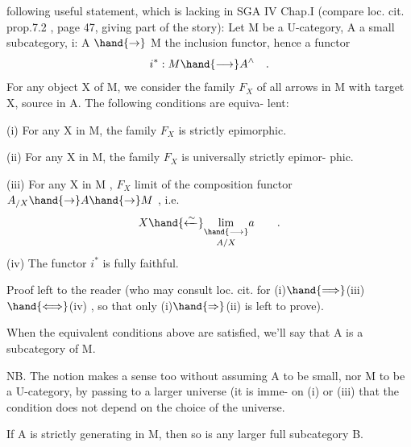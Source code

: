 
following useful statement,  which is lacking in SGA IV Chap.I
(compare loc. cit.  prop.7.2 , page 47,  giving part of the story):
\hand{\uline{\textcolor{black}{Proposition}}}  Let M be a U-category,  A a small  subcategory,  i: A $\hand{\to}$ M
the inclusion functor,  hence a functor
\[ i^{*} : M \hand{\longrightarrow} A^{\wedge} \quad . \]
For any object X of M,  we consider the family \xout{\unsure{$\Phi$}} $F_X$  of all arrows
in M with target X,  source in A.  The following conditions are equiva-%
lent:

(i)  For any X in M,  the family $F_X$ is strictly epimorphic.

(ii) For any X in M,  the family $F_X$ is universally strictly epimor-%
phic.

(iii)  For any X in M ,  $F_X$   limit of the
composition functor  $A_{/X} \hand{\to} A \hand{\to} M$ ,  i.e.
\[ X \hand{\xleftarrow{\sim}} \underset{A/X}{\underset{\hand{\longrightarrow}}{\mathrm{lim}}} a \qquad . \]
(iv)  The functor $i^{*}$ is fully faithful.

Proof left to the reader (who may consult loc. cit. for 
(i)$\hand{\Longrightarrow}$(iii)$\hand{\Longleftrightarrow}$(iv) ,  so that only (i)$\hand{\Rightarrow}$(ii) is left to prove).

\hand{\uline{\textcolor{black}{Definition}}}  When the equivalent conditions above are satisfied, we'll
say that A is a \hand{\uline{\textcolor{black}{strictly generating}}} subcategory of M.

NB. The notion makes a sense too without assuming  A to be small,
nor M to be a U-category,  by passing to a larger universe  (it is imme-%
on (i) or (iii)  that the condition does not depend on the choice of the
universe\hand{)}.

  If A is strictly generating in M,  then so is any larger
full subcategory B.

